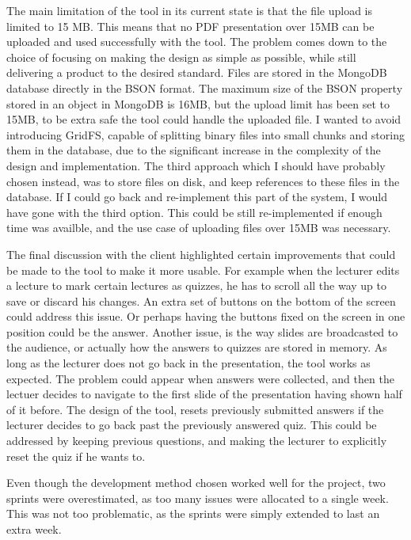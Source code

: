 The main limitation of the tool in its current state is that the file upload
is limited to 15 MB. This means that no PDF presentation over 15MB can be uploaded
and used successfully with the tool. The problem comes down to the choice of
focusing on making the design as simple as possible, while still delivering a
product to the desired standard. Files are stored in the MongoDB database directly
in the BSON format. The maximum size of the BSON property stored in an object in
MongoDB is 16MB, but the upload limit has been set to 15MB, to be extra safe the tool could
handle the uploaded file. I wanted to avoid introducing GridFS, capable of
splitting binary files into small chunks and storing them in the database, due
to the significant increase in the complexity of the design and implementation.
The third approach which I should have probably chosen instead, was to store files
on disk, and keep references to these files in the database. If I could go back
and re-implement this part of the system, I would have gone with the third option.
This could be still re-implemented if enough time was availble, and the use case
of uploading files over 15MB was necessary.

The final discussion with the client highlighted certain improvements that could
be made to the tool to make it more usable. For example when the lecturer edits
a lecture to mark certain lectures as quizzes, he has to scroll all the way up to
save or discard his changes. An extra set of buttons on the bottom of the screen
could address this issue. Or perhaps having the buttons fixed on the screen
in one position could be the answer. Another issue, is the way slides are broadcasted
to the audience, or actually how the answers to quizzes are stored in memory.
As long as the lecturer does not go back in the presentation, the tool works
as expected. The problem could appear when answers were collected, and then the
lectuer decides to navigate to the first slide of the presentation having shown half
of it before. The design of the tool, resets previously submitted answers if
the lecturer decides to go back past the previously answered quiz. This could be addressed by
keeping previous questions, and making the lecturer to explicitly reset the
quiz if he wants to.

Even though the development method chosen worked well for the project, two
sprints were overestimated, as too many issues were allocated to a single week.
This was not too problematic, as the sprints were simply extended to last an extra
week.

